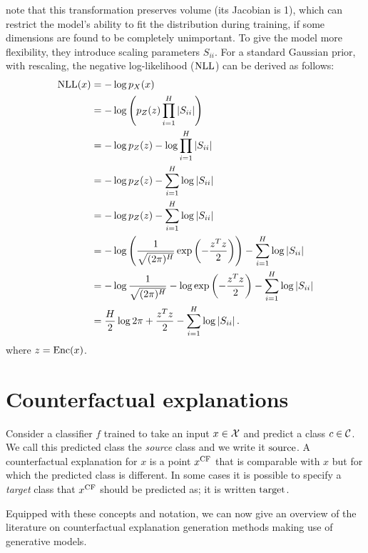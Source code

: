 \documentclass[../main.tex]{subfiles}
\begin{document}
\citeauthor{dinhNICE2015} note that this transformation preserves volume (its Jacobian is 1), which can restrict the model's ability to fit the distribution during training, \eg{} if some dimensions are found to be completely unimportant.
To give the model more flexibility, they introduce scaling parameters $S_{ii}$.
For a standard Gaussian prior, with rescaling, the negative log-likelihood ($\text{NLL}$) can be derived as follows:
\begin{align*}
    \text{NLL}(x)
     & = - \log p_X(x)                                                                               \\
     & = - \log \left( p_Z(z) \prod_{i=1}^H \left\lvert S_{ii}\right\rvert \right)                            \\
     & = - \log p_Z(z) - \log \prod_{i=1}^H \left\lvert S_{ii}\right\rvert                                    \\
     & = - \log p_Z(z) - \sum_{i=1}^H \log \left\lvert S_{ii}\right\rvert                                     \\
     & = - \log p_Z(z) - \sum_{i=1}^H \log \left\lvert S_{ii}\right\rvert                                     \\
     & = - \log \left( \frac{1}{\sqrt{(2 \pi)^H}} \exp\left(- \frac{z^T z}{2}\right)\right)
    - \sum_{i=1}^H \log \left\lvert S_{ii}\right\rvert                                                        \\
     & = - \log \frac{1}{\sqrt{(2 \pi)^H}}
    - \log \exp\left(- \frac{z^T z}{2}\right)
    - \sum_{i=1}^H \log \left\lvert S_{ii}\right\rvert                                                        \\
     & = \frac{H}{2} \log 2 \pi
    +  \frac{z^T z}{2}
    - \sum_{i=1}^H \log \left\lvert S_{ii}\right\rvert.
\end{align*}
where $z = \operatorname{Enc}(x)$.

\section{Counterfactual explanations}

Consider a classifier $f$ trained to take an input $x \in \mathcal{X}$ and predict a class $c \in \mathcal{C}$.
We call this predicted class the \emph{source} class and we write it $\mathrm{source}$.
A counterfactual explanation for $x$ is a point $x^\mathrm{CF}$ that is comparable with $x$ but for which the predicted
class is different.
In some cases it is possible to specify a \emph{target} class that $x^\mathrm{CF}$ should be predicted as; it is written $\mathrm{target}$.

Equipped with these concepts and notation, we can now give an overview of the literature on counterfactual explanation generation methods making use of generative models.
\end{document}
